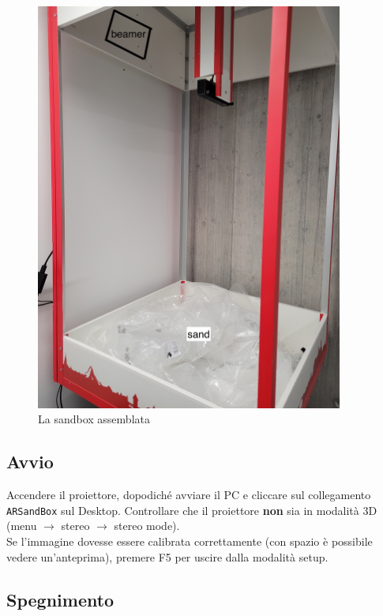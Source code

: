 \documentclass[12pt]{article}
\begin{document}
		\begin{figure}[H]
			\centering
			\includegraphics[width=0.9\textwidth]{img/sandbox.jpg}
			\caption*{La sandbox assemblata}
		\end{figure}
		
		
	\subsection{Avvio}

		Accendere il proiettore, dopodiché avviare il PC e cliccare sul collegamento
		\texttt{ARSandBox} sul Desktop. Controllare che il proiettore \textbf{non} sia in modalità 3D
		(menu $\rightarrow$ stereo $\rightarrow$ stereo mode).\\

		Se l'immagine dovesse essere calibrata correttamente (con spazio è possibile vedere 
		un'anteprima), premere F5 per uscire dalla modalità setup.

	\subsection{Spegnimento}
		
\end{document}

